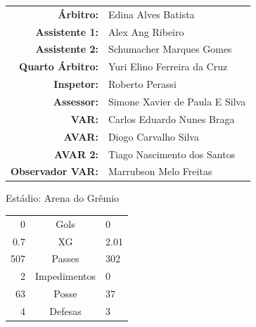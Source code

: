 \documentclass[11pt]{article}
\begin{document}
\vspace{0.5cm}
\begin{minipage}{0.65\textwidth}
\begin{center}
\begin{tabular}{rl}
\textbf{Árbitro:} & Edina Alves Batista \\
\textbf{Assistente 1:} & Alex Ang Ribeiro \\
\textbf{Assistente 2:} & Schumacher Marques Gomes \\
\textbf{Quarto Árbitro:} & Yuri Elino Ferreira da Cruz \\
\textbf{Inspetor:} & Roberto Perassi \\
\textbf{Assessor:} & Simone Xavier de Paula E Silva \\
\textbf{VAR:} & Carlos Eduardo Nunes Braga \\
\textbf{AVAR:} & Diogo Carvalho Silva \\
\textbf{AVAR 2:} & Tiago Nascimento dos Santos \\
\textbf{Observador VAR:} & Marrubson Melo Freitas \\
\end{tabular}
\end{center}
\end{minipage}
\begin{minipage}{0.3\textwidth}
Estádio: Arena do Grêmio\\
\begin{tabular}{rcl}
0 & Gols & 0 \\
0.7 & XG & 2.01 \\
507 & Passes & 302 \\
2 & Impedimentos & 0 \\
63 & Posse & 37 \\
4 & Defesas & 3 \\
\end{tabular}
\end{minipage}
\newpage
\end{document}
